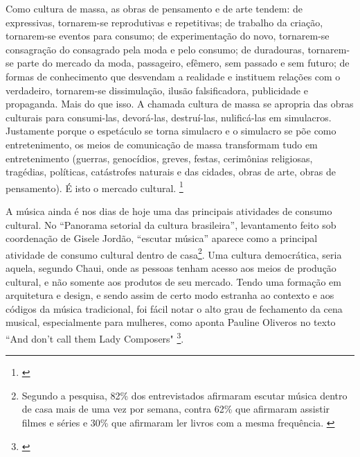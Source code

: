 \begin{citacao}

Como cultura de massa, as obras de pensamento e de arte tendem: de expressivas, tornarem-se reprodutivas e repetitivas; de trabalho da criação, tornarem-se eventos para consumo; de experimentação do novo, tornarem-se consagração do consagrado pela moda e pelo consumo; de duradouras, tornarem-se parte do mercado da moda, passageiro, efêmero, sem passado e sem futuro; de formas de conhecimento que desvendam a realidade e instituem relações com o verdadeiro, tornarem-se dissimulação, ilusão falsificadora, publicidade e propaganda. Mais do que isso. A chamada cultura de massa se apropria das obras culturais para consumi-las, devorá-las, destruí-las, nulificá-las em simulacros. Justamente porque o espetáculo se torna simulacro e o simulacro se põe como entretenimento, os meios de comunicação de massa transformam tudo em entretenimento (guerras, genocídios, greves, festas, cerimônias religiosas, tragédias, políticas, catástrofes naturais e das cidades, obras de arte, obras de pensamento). É isto o mercado cultural. \footnote{\cite[p. 61]{MarilenaChaui2008}}
\end{citacao}

 A música ainda é nos dias de hoje uma das principais atividades de consumo cultural. No ``Panorama setorial da cultura brasileira'', levantamento feito sob coordenação de Gisele Jordão, ``escutar música'' aparece como a principal atividade de consumo cultural dentro de casa\footnote{Segundo a pesquisa, 82\% dos entrevistados afirmaram escutar música dentro de casa mais de uma vez por semana, contra 62\% que afirmaram assistir filmes e séries e 30\% que afirmaram ler livros com a mesma frequência. \cite[p. 52]{Jordao2018}}. Uma cultura democrática, seria aquela, segundo Chaui, onde as pessoas tenham acesso aos meios de produção cultural, e não somente aos produtos de seu mercado. Tendo uma formação em arquitetura e design, e sendo assim de certo modo estranha ao contexto e aos códigos da música tradicional, foi fácil notar o alto grau de fechamento da cena musical, especialmente para mulheres, como aponta Pauline Oliveros no texto ``And don't call them Lady Composers" \footnote{\cite[p. 48]{Oliveros2012}}. 

